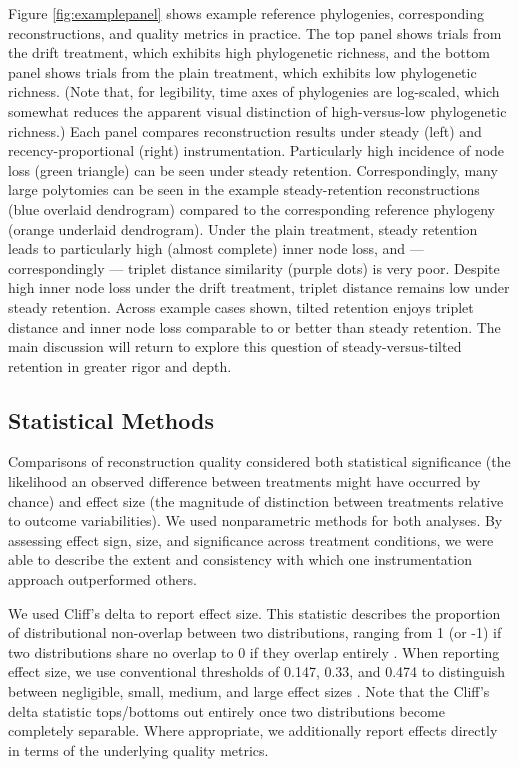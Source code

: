 

Figure \ref{fig:examplepanel} shows example reference phylogenies, corresponding reconstructions, and quality metrics in practice.
The top panel shows trials from the drift treatment, which exhibits high phylogenetic richness, and the bottom panel shows trials from the plain treatment, which exhibits low phylogenetic richness.
(Note that, for legibility, time axes of phylogenies are log-scaled, which somewhat reduces the apparent visual distinction of high-versus-low phylogenetic richness.)
Each panel compares reconstruction results under steady (left) and recency-proportional (right) instrumentation.
Particularly high incidence of node loss (green triangle) can be seen under steady retention.
Correspondingly, many large polytomies can be seen in the example steady-retention reconstructions (blue overlaid dendrogram) compared to the corresponding reference phylogeny (orange underlaid dendrogram).
Under the plain treatment, steady retention leads to particularly high (almost complete) inner node loss, and --- correspondingly --- triplet distance similarity (purple dots) is very poor.
Despite high inner node loss under the drift treatment, triplet distance remains low under steady retention.
Across example cases shown, tilted retention enjoys triplet distance and inner node loss comparable to or better than steady retention.
The main discussion will return to explore this question of steady-versus-tilted retention in greater rigor and depth.

\subsection{Statistical Methods}

Comparisons of reconstruction quality considered both statistical significance (the likelihood an observed difference between treatments might have occurred by chance) and effect size (the magnitude of distinction between treatments relative to outcome variabilities).
We used nonparametric methods for both analyses.
By assessing effect sign, size, and significance across treatment conditions, we were able to describe the extent and consistency with which one instrumentation approach outperformed others.

We used Cliff's delta to report effect size.
This statistic describes the proportion of distributional non-overlap between two distributions, ranging from 1 (or -1) if two distributions share no overlap to 0 if they overlap entirely \citep{cliff1993dominance}.
When reporting effect size, we use conventional thresholds of 0.147, 0.33, and 0.474 to distinguish between negligible, small, medium, and large effect sizes \citep{hess2004robust}.
Note that the Cliff's delta statistic tops/bottoms out entirely once two distributions become completely separable.
Where appropriate, we additionally report effects directly in terms of the underlying quality metrics.

